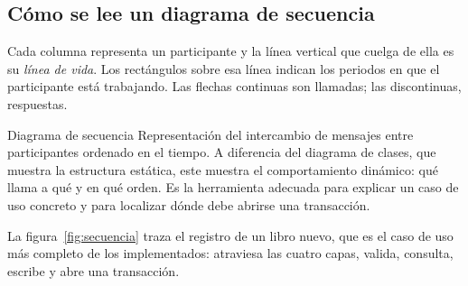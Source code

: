 \documentclass[11pt,a4paper,openany]{book}
\begin{document}
\subsection{Cómo se lee un diagrama de secuencia}
\label{sec:leer-secuencia}

Cada columna representa un participante y la línea vertical que cuelga de ella es su \emph{línea de vida}. Los rectángulos sobre esa línea indican los periodos en que el participante está trabajando. Las flechas continuas son llamadas; las discontinuas, respuestas.

\begin{cajadefinicion}{Diagrama de secuencia}
	Representación del intercambio de mensajes entre participantes ordenado en el tiempo. A diferencia del diagrama de clases, que muestra la estructura estática, este muestra el comportamiento dinámico: qué llama a qué y en qué orden. Es la herramienta adecuada para explicar un caso de uso concreto y para localizar dónde debe abrirse una transacción.
\end{cajadefinicion}

La figura~\ref{fig:secuencia} traza el registro de un libro nuevo, que es el caso de uso más completo de los implementados: atraviesa las cuatro capas, valida, consulta, escribe y abre una transacción.
\end{document}

